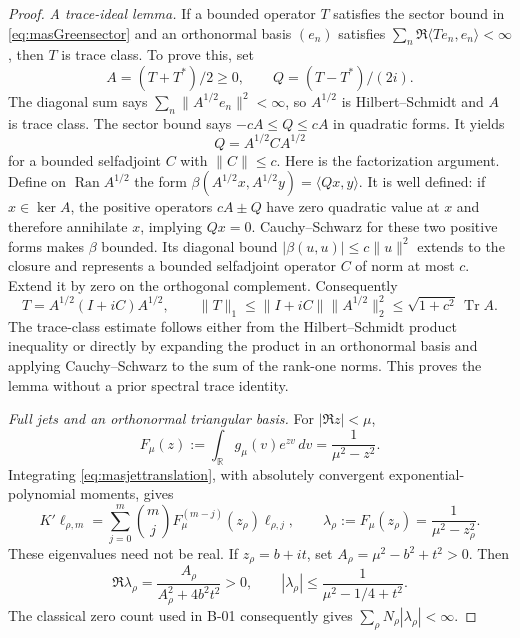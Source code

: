 \documentclass[11pt,a4paper]{article}
\newcommand{\Tr}{\operatorname{Tr}}
\newcommand{\R}{\mathbb R}
\newcommand{\fid}[1]{\textsf{#1}}
\begin{document}
\begin{proof}
\emph{A trace-ideal lemma.}
If a bounded operator $T$ satisfies the sector bound in \eqref{eq:masGreensector} and an orthonormal basis $(e_n)$ satisfies
$\sum_n\Re\langle Te_n,e_n\rangle<\infty$, then $T$ is trace class. To prove this, set
\[
 A=(T+T^*)/2\ge0,\qquad Q=(T-T^*)/(2i).
\]
The diagonal sum says
$\sum_n\|A^{1/2}e_n\|^2<\infty$, so $A^{1/2}$ is Hilbert--Schmidt and $A$ is trace class. The sector bound says $-cA\le Q\le cA$ in quadratic forms. It yields
\[
 Q=A^{1/2}CA^{1/2}
\]
for a bounded selfadjoint $C$ with $\|C\|\le c$. Here is the factorization argument. Define on $\operatorname{Ran}A^{1/2}$ the form
$\beta(A^{1/2}x,A^{1/2}y)=\langle Qx,y\rangle$.
It is well defined: if $x\in\ker A$, the positive operators $cA\pm Q$ have zero quadratic value at $x$ and therefore annihilate $x$, implying $Qx=0$. Cauchy--Schwarz for these two positive forms makes $\beta$ bounded. Its diagonal bound
$|\beta(u,u)|\le c\|u\|^2$ extends to the closure and represents a bounded selfadjoint operator $C$ of norm at most $c$. Extend it by zero on the orthogonal complement. Consequently
\[
 T=A^{1/2}(I+iC)A^{1/2},\qquad
 \|T\|_1\le\|I+iC\|\|A^{1/2}\|_2^2
 \le\sqrt{1+c^2}\,\Tr A.
\]
The trace-class estimate follows either from the Hilbert--Schmidt product inequality or directly by expanding the product in an orthonormal basis and applying Cauchy--Schwarz to the sum of the rank-one norms. This proves the lemma without a prior spectral trace identity.

\emph{Full jets and an orthonormal triangular basis.}
For $|\Re z|<\mu$,
\[
 F_\mu(z):=\int_{\R}g_\mu(v)e^{zv}\,dv
 =\frac1{\mu^2-z^2}.
\]
Integrating \eqref{eq:masjettranslation}, with absolutely convergent exponential-polynomial moments, gives
\[
 K'\ell_{\rho,m}
 =\sum_{j=0}^m\binom{m}{j}
 F_\mu^{(m-j)}(z_\rho)\ell_{\rho,j},
 \qquad \lambda_\rho:=F_\mu(z_\rho)=\frac1{\mu^2-z_\rho^2}.
\]
These eigenvalues need not be real. If $z_\rho=b+it$, set $A_\rho=\mu^2-b^2+t^2>0$. Then
\[
 \Re\lambda_\rho=\frac{A_\rho}{A_\rho^2+4b^2t^2}>0,
 \qquad |\lambda_\rho|\le\frac1{\mu^2-1/4+t^2}.
\]
The classical zero count used in \fid{B-01} consequently gives
$\sum_\rho N_\rho|\lambda_\rho|<\infty$.


\end{proof}
\end{document}
